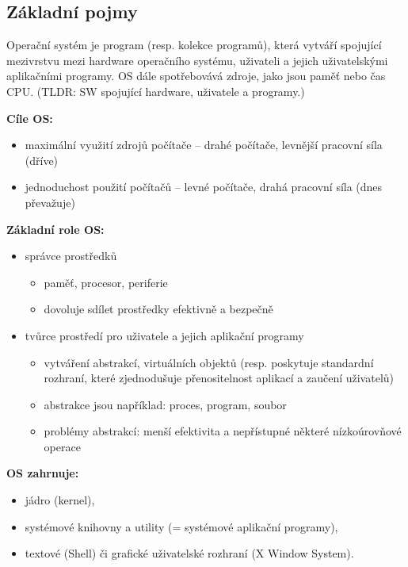 \documentclass[a4paper, 11pt]{article}
\begin{document}
\subsection{Základní pojmy}
Operační systém je program (resp. kolekce programů), která vytváří spojující mezivrstvu mezi hardware operačního systému, uživateli a jejich uživatelskými aplikačními programy. OS dále spotřebovává zdroje, jako jsou paměť nebo čas CPU.
(TLDR: SW spojující hardware, uživatele a programy.)

\textbf{Cíle OS:}
\begin{itemize}
    \item maximální využití zdrojů počítače -- drahé počítače, levnější pracovní síla (dříve)
    \item jednoduchost použití počítačů -- levné počítače, drahá pracovní síla (dnes převažuje)
\end{itemize}

\textbf{Základní role OS:}
\begin{itemize}
    \item správce prostředků
        \begin{itemize}
            \item paměť, procesor, periferie
             \item dovoluje sdílet prostředky efektivně a bezpečně
        \end{itemize}
    \item tvůrce prostředí pro uživatele a jejich aplikační programy
        \begin{itemize}
            \item vytváření abstrakcí, virtuálních objektů (resp. poskytuje standardní rozhraní, které zjednodušuje přenositelnost aplikací a zaučení uživatelů)
            \item abstrakce jsou například: proces, program, soubor
            \item problémy abstrakcí: menší efektivita a nepřístupné některé nízkoúrovňové operace
        \end{itemize}
\end{itemize}

\textbf{OS zahrnuje:}
\begin{itemize}
    \item jádro (kernel),
    \item systémové knihovny a utility (= systémové aplikační programy),
    \item textové (Shell) či grafické uživatelské rozhraní (X Window System).
\end{itemize}
\end{document}
